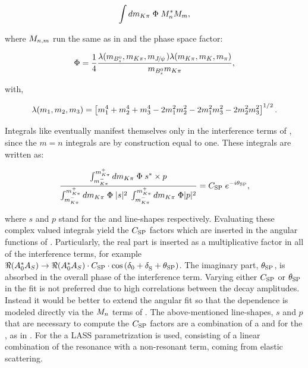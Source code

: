\begin{equation}
  \label{spIntegrals}
  \int d\mkpi \; \Phi \; \mKpiAmp^* \mKpiAmp[m],
\end{equation}

\noindent where $\mKpiAmp[n,m]$ run the same as in  and the phase space factor:

\begin{equation}
  \label{csp_ph_sp_factor}
  \centering
  \Phi = \frac{1}{4} \frac{\lambda(\mass{\Bs},\mass{\kaon\pion},\mass{\jpsi}) \lambda(\mass{\kaon\pion},\mass{\kaon},\mass{\pion})}{{\mass{\Bs} \mass{\kaon\pion}}},
\end{equation}

\noindent with,
\vspace{-0.5cm}

\begin{equation}
  \centering
  \lambda(m_1,m_2,m_3) = \left[ m_1^4 + m_2^4 + m_3^4 - 2 m_1^2 m_2^2 - 2 m_1^2 m_3^2 - 2 m_2^2 m_3^2 \right]^{1/2}. \nonumber
  \label{csp_ph_sp_factor_def}
\end{equation}

Integrals like  eventually manifest themselves only in the \spwave interference
terms of , since the $m=n$ integrals are by construction equal to one.
These integrals are written as:

\begin{equation}
  \centering
  \label{csp_def}
  \frac{\int_{\mkpi^-}^{\mkpi^+} d\mkpi \; \Phi \; s^* \times p} {\int_{\mkpi^-}^{\mkpi^+} d\mkpi \; \Phi \; |s|^2 \; \int_{\mkpi^-}^{\mkpi^+} d\mkpi \; \Phi |p|^2} = \CSP \; e^{-i\ThetaSP},
\end{equation}

\noindent where $s$ and $p$ stand for the \swave and \pwave line-shapes respectively. Evaluating these complex valued integrals yield
the  $\CSP$ factors which are inserted in the angular functions of . Particularly, the real part
is inserted as a multiplicative factor in all of the \spwave interference terms, for example $\ReAmp{0}{S} \to \ReAmp{0}{S} \cdot \CSP\cdot\cos\parenthesis{\ampPhase{0}+\deltaS{}+\ThetaSP}$.
The imaginary part, $\ThetaSP$, is absorbed in the overall phase of the \spwave interference term.
Varying either $\CSP$ or $\ThetaSP$ in the fit is not preferred due to high correlations between the decay amplitudes.
Instead it would be better to extend the angular fit so that the \mkpi dependence is modeled directly via the $\mKpiAmp$
terms of . The above-mentioned line-shapes, $s$ and $p$ that are necessary
to compute the $\CSP$ factors are a combination of a \KstENT and \KstOFOZ for the \pwave, as
in \cite{PhysRevD.11.3165}. For the \swave a LASS parametrization \cite{Aston1988493} is used,
consisting of a linear combination of the \KstOFTZ resonance with a non-resonant term, coming from elastic scattering.

